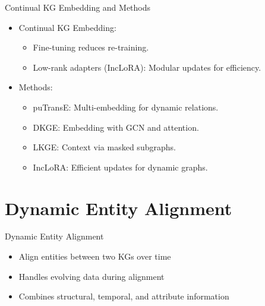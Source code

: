 \documentclass{beamer}
\begin{document}
    \begin{frame}{Continual KG Embedding and Methods}
        \begin{itemize}
            \item Continual KG Embedding:
            \begin{itemize}
                \item Fine-tuning reduces re-training.
                \item Low-rank adapters (IncLoRA): Modular updates for efficiency.
            \end{itemize}
            \item Methods:
            \begin{itemize}
                \item puTransE: Multi-embedding for dynamic relations.
                \item DKGE: Embedding with GCN and attention.
                \item LKGE: Context via masked subgraphs.
                \item IncLoRA: Efficient updates for dynamic graphs.
            \end{itemize}
        \end{itemize}
    \end{frame}

    
    \section{Dynamic Entity Alignment}
    
    \begin{frame}{Dynamic Entity Alignment}
        \begin{itemize}
            \item Align entities between two KGs over time
            \item Handles evolving data during alignment
            \item Combines structural, temporal, and attribute information
        \end{itemize}
    \end{frame}
\end{document}
